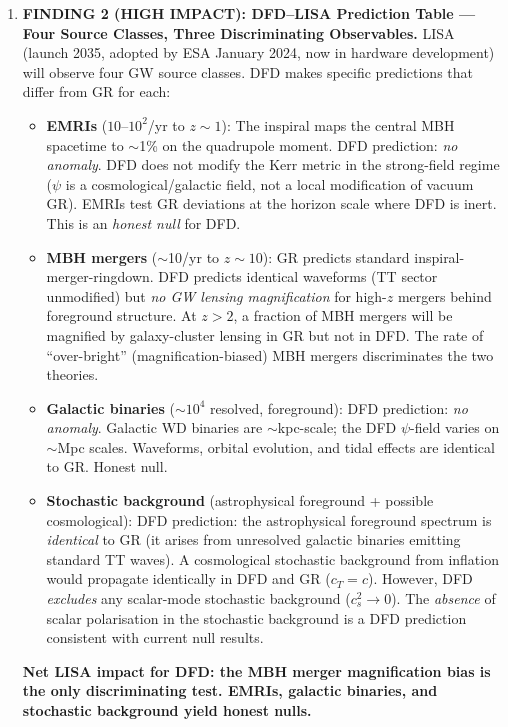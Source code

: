 \documentclass[11pt]{article}
\theoremstyle{definition}
\theoremstyle{remark}
\begin{document}
\begin{tcolorbox}[colback=blue!5!white, colframe=blue!60!black,
  title=\textbf{TOP 5 FINDINGS --- W4i17 P6 (Ranked by Impact)}]
\begin{enumerate}[nosep]
\item \textbf{FINDING 2 (HIGH IMPACT): DFD--LISA Prediction Table ---
  Four Source Classes, Three Discriminating Observables.}
  LISA (launch 2035, adopted by ESA January 2024, now in hardware
  development) will observe four GW source classes. DFD makes specific
  predictions that differ from GR for each:
  \begin{itemize}[nosep]
  \item \textbf{EMRIs} ($10$--$10^2$/yr to $z \sim 1$): The inspiral
    maps the central MBH spacetime to $\sim$1\% on the quadrupole moment.
    DFD prediction: \emph{no anomaly}. DFD does not modify the Kerr
    metric in the strong-field regime ($\psi$ is a cosmological/galactic
    field, not a local modification of vacuum GR). EMRIs test GR
    deviations at the horizon scale where DFD is inert. This is an
    \emph{honest null} for DFD.
  \item \textbf{MBH mergers} ($\sim$10/yr to $z \sim 10$): GR predicts
    standard inspiral-merger-ringdown. DFD predicts identical waveforms
    (TT sector unmodified) but \emph{no GW lensing magnification} for
    high-$z$ mergers behind foreground structure. At $z > 2$, a fraction
    of MBH mergers will be magnified by galaxy-cluster lensing in GR
    but not in DFD. The rate of ``over-bright'' (magnification-biased)
    MBH mergers discriminates the two theories.
  \item \textbf{Galactic binaries} ($\sim$$10^4$ resolved, foreground):
    DFD prediction: \emph{no anomaly}. Galactic WD binaries are
    $\sim$kpc-scale; the DFD $\psi$-field varies on $\sim$Mpc scales.
    Waveforms, orbital evolution, and tidal effects are identical to GR.
    Honest null.
  \item \textbf{Stochastic background} (astrophysical foreground +
    possible cosmological): DFD prediction: the astrophysical foreground
    spectrum is \emph{identical} to GR (it arises from unresolved
    galactic binaries emitting standard TT waves). A cosmological
    stochastic background from inflation would propagate identically in
    DFD and GR ($c_T = c$). However, DFD \emph{excludes} any
    scalar-mode stochastic background ($c_s^2 \to 0$). The \emph{absence}
    of scalar polarisation in the stochastic background is a DFD
    prediction consistent with current null results.
  \end{itemize}
  \textbf{Net LISA impact for DFD: the MBH merger magnification bias
  is the only discriminating test. EMRIs, galactic binaries, and
  stochastic background yield honest nulls.}


\end{enumerate}
\end{tcolorbox}
\end{document}

